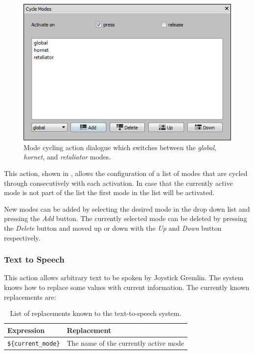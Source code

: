 \documentclass[a4, 10pt]{article}
\newcommand{\JG}{Joystick Gremlin}
\begin{document}
\begin{figure}[bt]
    \centering

    \includegraphics[width=0.75\linewidth]{images/action_cycle_modes}
    \caption{Mode cycling action dialogue which switches between the
        \emph{global}, \emph{hornet}, and \emph{retaliator} modes.}
    \label{fig:action_cycle_modes}
\end{figure}

This action, shown in , allows the
configuration of a list of modes that are cycled through consecutively
with each activation. In case that the currently active mode is not part
of the list the first mode in the list will be activated.

New modes can be added by selecting the desired mode in the drop down
list and pressing the \emph{Add} button. The currently selected mode can
be deleted by pressing the \emph{Delete} button and moved up or down
with the \emph{Up} and \emph{Down} button respectively.

\FloatBarrier

\subsubsection{Text to Speech}

This action allows arbitrary text to be spoken by \JG{}. The system
knows how to replace some values with current information. The currently
known replacements are:

\begin{table}[h]
    \centering

    \begin{tabular}{ll}
        \toprule
        Expression & Replacement \\
        \midrule
        \verb+${current_mode}+ & The name of the currently active mode \\
        \bottomrule
    \end{tabular}

    \caption{List of replacements known to the text-to-speech system.}
\end{table}
\end{document}
